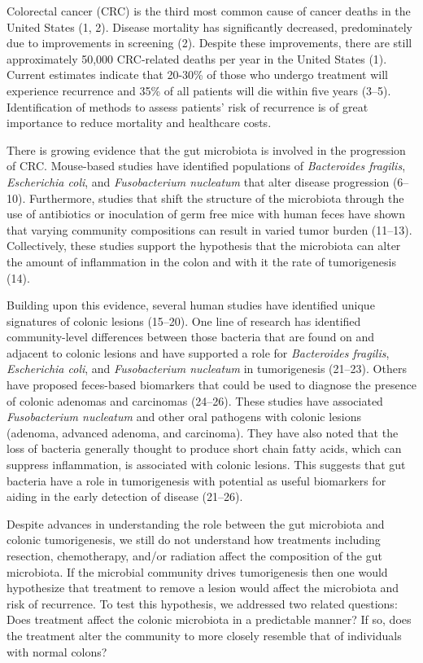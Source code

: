 \documentclass[12pt,]{article}
\begin{document}
Colorectal cancer (CRC) is the third most common cause of cancer deaths
in the United States (1, 2). Disease mortality has significantly
decreased, predominately due to improvements in screening (2). Despite
these improvements, there are still approximately 50,000 CRC-related
deaths per year in the United States (1). Current estimates indicate
that 20-30\% of those who undergo treatment will experience recurrence
and 35\% of all patients will die within five years (3--5).
Identification of methods to assess patients' risk of recurrence is of
great importance to reduce mortality and healthcare costs.

There is growing evidence that the gut microbiota is involved in the
progression of CRC. Mouse-based studies have identified populations of
\emph{Bacteroides fragilis}, \emph{Escherichia coli}, and
\emph{Fusobacterium nucleatum} that alter disease progression (6--10).
Furthermore, studies that shift the structure of the microbiota through
the use of antibiotics or inoculation of germ free mice with human feces
have shown that varying community compositions can result in varied
tumor burden (11--13). Collectively, these studies support the
hypothesis that the microbiota can alter the amount of inflammation in
the colon and with it the rate of tumorigenesis (14).

Building upon this evidence, several human studies have identified
unique signatures of colonic lesions (15--20). One line of research has
identified community-level differences between those bacteria that are
found on and adjacent to colonic lesions and have supported a role for
\emph{Bacteroides fragilis}, \emph{Escherichia coli}, and
\emph{Fusobacterium nucleatum} in tumorigenesis (21--23). Others have
proposed feces-based biomarkers that could be used to diagnose the
presence of colonic adenomas and carcinomas (24--26). These studies have
associated \emph{Fusobacterium nucleatum} and other oral pathogens with
colonic lesions (adenoma, advanced adenoma, and carcinoma). They have
also noted that the loss of bacteria generally thought to produce short
chain fatty acids, which can suppress inflammation, is associated with
colonic lesions. This suggests that gut bacteria have a role in
tumorigenesis with potential as useful biomarkers for aiding in the
early detection of disease (21--26).

Despite advances in understanding the role between the gut microbiota
and colonic tumorigenesis, we still do not understand how treatments
including resection, chemotherapy, and/or radiation affect the
composition of the gut microbiota. If the microbial community drives
tumorigenesis then one would hypothesize that treatment to remove a
lesion would affect the microbiota and risk of recurrence. To test this
hypothesis, we addressed two related questions: Does treatment affect
the colonic microbiota in a predictable manner? If so, does the
treatment alter the community to more closely resemble that of
individuals with normal colons?
\end{document}
